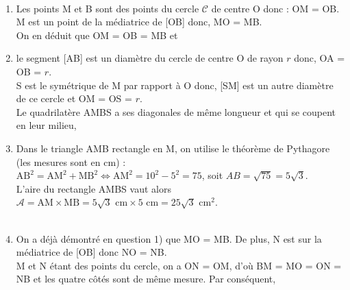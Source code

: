 \ \\ [-5mm]
\begin{enumerate}
   \item Les points M et B sont des points du cercle $\mathcal{C}$ de centre O donc : OM = OB. \\
   M est un point de la médiatrice de [OB] donc, MO = MB. \\
   On en déduit que OM = OB = MB et 
   \item le segment [AB] est un diamètre du cercle de centre O de rayon $r$ donc, OA = OB = $r$. \\
   S est le symétrique de M par rapport à O donc, [SM] est un autre diamètre de ce cercle et OM = OS = $r$. \\
   Le quadrilatère AMBS a ses diagonales de même longueur et qui se coupent en leur milieu, 
   \item Dans le triangle AMB rectangle en M, on utilise le théorème de Pythagore (les mesures sont en cm) : \\
   $\text{AB}^2 =\text{AM}^2+\text{MB}^2 \iff \text{AM}^2 =10^2-5^2 =75$, soit $AB =\sqrt{75} =5\sqrt3$. \\
   L'aire du rectangle AMBS vaut alors $\mathcal{A} =\text{AM}\times\text{MB} =5\sqrt3\text{ cm}\times5\text{ cm} =25\sqrt3\text{ cm}^2$. \\
    \\
   \item On a déjà démontré en question 1) que MO = MB. De plus, N est sur la médiatrice de [OB] donc NO = NB. \\
   M et N étant des points du cercle, on a ON = OM, d'où BM = MO = ON = NB et les quatre côtés sont de même mesure. Par conséquent, 
\end{enumerate}
